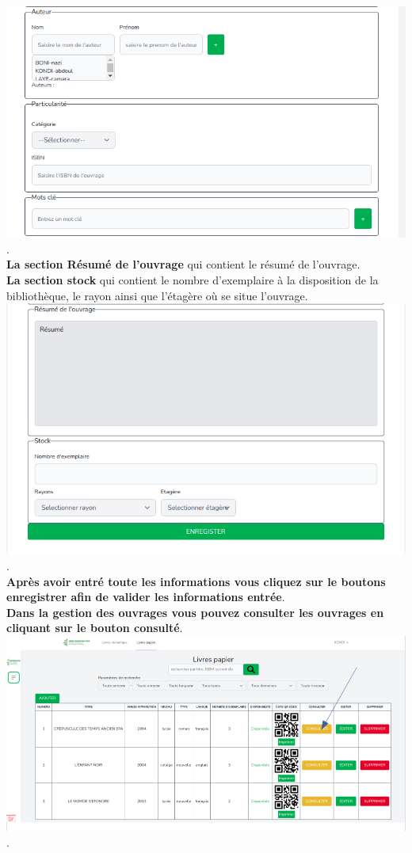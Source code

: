 \documentclass[12pt,a4paper]{article}
\begin{document}
\includegraphics[scale=0.5]{images/AuteurParticulariteMotCle.png}.\\

\textbf{La section Résumé de l'ouvrage} qui contient le résumé de l'ouvrage.\\
\textbf{La section stock} qui contient le nombre d'exemplaire à la disposition de la bibliothèque, le rayon ainsi que l'étagère où se situe l'ouvrage.\\

\includegraphics[scale=0.5]{images/ResumeStock.png}.\\

\textbf{Après avoir entré toute les informations vous cliquez sur le boutons enregistrer afin de valider les informations entrée}.\\

\newpage
\textbf{Dans la gestion des ouvrages vous pouvez consulter les ouvrages en cliquant sur le bouton consulté}. \\

\includegraphics[scale=0.5]{images/ConsultationOuvragePhysique.png}.
\end{document}
